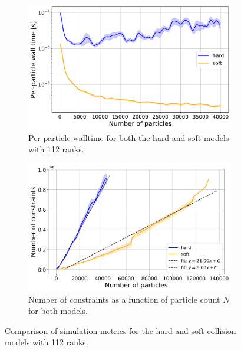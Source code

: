 \documentclass[conference]{IEEEtran}
\begin{document}
\begin{figure}[h]
    \centering
    \begin{subfigure}[b]{0.9\linewidth}
        \centering
        \includegraphics[width=\linewidth]{figures/comparison_plots/combined_num_particles_vs_wall_time_per_particle_with_fit.png}
        \caption{Per-particle walltime for both the hard and soft models with 112 ranks.}
        \label{fig:walltime_per_particle}
    \end{subfigure}


    \begin{subfigure}[b]{0.9\linewidth}
        \centering
        \includegraphics[width=\linewidth]{figures/comparison_plots/combined_num_constraints_vs_num_particles_with_fit.png}
        \caption{Number of constraints as a function of particle count $N$ for both models.}
        \label{fig:num_constraints}
    \end{subfigure}

    \caption{Comparison of simulation metrics for the hard and soft collision models with 112 ranks.}
    \label{fig:comparison_metrics}
\end{figure}
\end{document}

